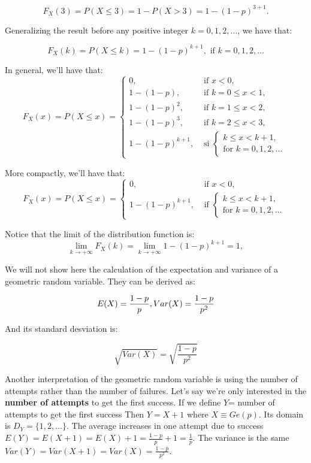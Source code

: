\documentclass[
]{book}
\theoremstyle{definition}
\theoremstyle{definition}
\theoremstyle{definition}
\theoremstyle{definition}
\theoremstyle{remark}
\begin{document}
\[
F_X(3)=P(X\leq 3)=1-P(X>3)=1-(1-p)^{3+1}.
\]

Generalizing the result before any positive integer \(k=0,1,2,\ldots\), we have that:

\[
F_X(k)=P(X\leq k)=1-(1-p)^{k+1},\mbox{ if } k=0,1,2,\ldots
\]

In general, we'll have that:
\[
F_X(x)=P(X\leq x)=
\left\{\begin{array}{ll} 
0, & \mbox{ if } x<0,\\
1- (1-p),  & \mbox{ if } k=0\leq x <1,\\
1- (1-p)^2, & \mbox{ if } k=1\leq x <2,\\
1- (1-p)^3, & \mbox{ if } k=2\leq x <3,\\
1- (1-p)^{k+1}, & \mbox{ si } \left\{ \begin{array}{l}k\leq x< k+1,\\\mbox{for } k=0,1,2,\ldots\end{array}
    \right.\end{array}\right.
\]

More compactly, we'll have that:
\[
F_X(x)=P(X\leq x)=
\left\{\begin{array}{ll} 
0, & \mbox{ if } x<0,\\
1- (1-p)^{k+1}, & \mbox{ if } \left\{ \begin{array}{l}k\leq x< k+1,\\\mbox{for } k=0,1,2,\ldots\end{array}
    \right.\end{array}
    \right.
\]

Notice that the limit of the distribution function is:
\[
\displaystyle\lim_{k\to +\infty } F_X(k)=\lim_{k\to +\infty } 1-(1-p)^{k+1}=
1,
\]

We will not show here the calculation of the expectation and variance of a geometric random variable. They can be derived as:

\[
E(X)= \frac{1-p}{p}, \\
Var(X) =  \frac{1-p}{p^2}
\]

And its standard desviation is:

\[
\sqrt{Var(X)}=\sqrt{\frac{1-p}{p^2}}
\]

Another interpretation of the geometric random variable is using the number of attempts rather than the number of failures. Let's say we're only interested in the \textbf{number of attempts} to get the first success. If we define \(Y\)= number of attempts to get the first success Then \(Y=X+1\) where \(X\equiv Ge(p)\). Its domain is \(D_Y=\{1,2,\ldots\}\). The average increases in one attempt due to success \(E(Y)=E(X+1)=E(X)+1=\frac{1-p}{p}+1=\frac1{p}\). The variance is the same \(Var(Y)=Var(X+1)=Var(X)=\frac{1-p}{p^2}\).
\end{document}
